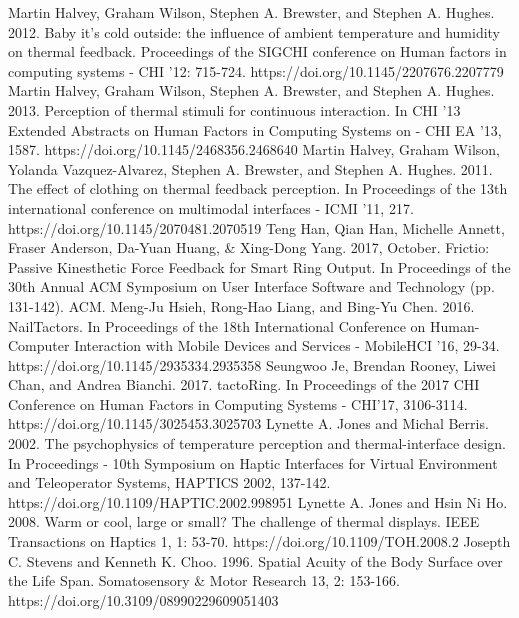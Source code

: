 \documentclass[preprint,12pt]{elsarticle}
\begin{document}
\begin{thebibliography}{00}
Martin Halvey, Graham Wilson, Stephen A. Brewster, and Stephen A. Hughes. 2012. Baby it's cold outside: the influence of ambient temperature and humidity on thermal feedback. Proceedings of the SIGCHI conference on Human factors in computing systems - CHI '12: 715-724. https://doi.org/10.1145/2207676.2207779
Martin Halvey, Graham Wilson, Stephen A. Brewster, and Stephen A. Hughes. 2013. Perception of thermal stimuli for continuous interaction. In CHI '13 Extended Abstracts on Human Factors in Computing Systems on - CHI EA '13, 1587. https://doi.org/10.1145/2468356.2468640
Martin Halvey, Graham Wilson, Yolanda Vazquez-Alvarez, Stephen A. Brewster, and Stephen A. Hughes. 2011. The effect of clothing on thermal feedback perception. In Proceedings of the 13th international conference on multimodal interfaces - ICMI '11, 217. https://doi.org/10.1145/2070481.2070519
Teng Han, Qian Han, Michelle Annett, Fraser Anderson, Da-Yuan Huang, \& Xing-Dong Yang. 2017, October. Frictio: Passive Kinesthetic Force Feedback for Smart Ring Output. In Proceedings of the 30th Annual ACM Symposium on User Interface Software and Technology (pp. 131-142). ACM.
Meng-Ju Hsieh, Rong-Hao Liang, and Bing-Yu Chen. 2016. NailTactors. In Proceedings of the 18th International Conference on Human-Computer Interaction with Mobile Devices and Services - MobileHCI '16, 29-34. https://doi.org/10.1145/2935334.2935358
Seungwoo Je, Brendan Rooney, Liwei Chan, and Andrea Bianchi. 2017. tactoRing. In Proceedings of the 2017 CHI Conference on Human Factors in Computing Systems - CHI'17, 3106-3114. https://doi.org/10.1145/3025453.3025703
Lynette A. Jones and Michal Berris. 2002. The psychophysics of temperature perception and thermal-interface design. In Proceedings - 10th Symposium on Haptic Interfaces for Virtual Environment and Teleoperator Systems, HAPTICS 2002, 137-142. https://doi.org/10.1109/HAPTIC.2002.998951
Lynette A. Jones and Hsin Ni Ho. 2008. Warm or cool, large or small? The challenge of thermal displays. IEEE Transactions on Haptics 1, 1: 53-70. https://doi.org/10.1109/TOH.2008.2
Josepth C. Stevens and Kenneth K. Choo. 1996. Spatial Acuity of the Body Surface over the Life Span. Somatosensory \& Motor Research 13, 2: 153-166. https://doi.org/10.3109/08990229609051403

\end{thebibliography}
\end{document}

